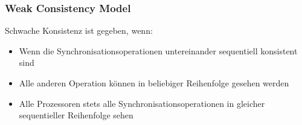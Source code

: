 \documentclass{sikslides}
\begin{document}
\begin{frame}
	\frametitle{Weak Consistency Model}
 Schwache Konsistenz ist gegeben, wenn: \bigskip
	\begin{itemize}
		\item Wenn die Synchronisationsoperationen untereinander sequentiell konsistent sind \bigskip
		\item Alle anderen Operation können in beliebiger Reihenfolge gesehen werden \bigskip
		\item Alle Prozessoren stets alle Synchronisationsoperationen in gleicher sequentieller Reihenfolge sehen 
	\end{itemize}
\end{frame}






\end{document}
